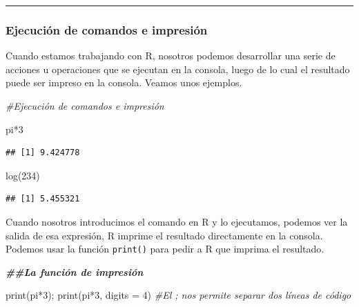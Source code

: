 \documentclass[
]{article}
\newenvironment{Shaded}{\begin{snugshade}}{\end{snugshade}}
\newcommand{\AttributeTok}[1]{\textcolor[rgb]{0.77,0.63,0.00}{#1}}
\newcommand{\CommentTok}[1]{\textcolor[rgb]{0.56,0.35,0.01}{\textit{#1}}}
\newcommand{\DecValTok}[1]{\textcolor[rgb]{0.00,0.00,0.81}{#1}}
\newcommand{\DocumentationTok}[1]{\textcolor[rgb]{0.56,0.35,0.01}{\textbf{\textit{#1}}}}
\newcommand{\FunctionTok}[1]{\textcolor[rgb]{0.00,0.00,0.00}{#1}}
\newcommand{\NormalTok}[1]{#1}
\newcommand{\SpecialCharTok}[1]{\textcolor[rgb]{0.00,0.00,0.00}{#1}}
\begin{document}
\begin{center}\rule{0.5\linewidth}{0.5pt}\end{center}

\hypertarget{ejecuciuxf3n-de-comandos-e-impresiuxf3n}{%
\subsubsection{Ejecución de comandos e
impresión}\label{ejecuciuxf3n-de-comandos-e-impresiuxf3n}}

Cuando estamos trabajando con R, nosotros podemos desarrollar una serie
de acciones u operaciones que se ejecutan en la consola, luego de lo
cual el resultado puede ser impreso en la consola. Veamos unos ejemplos.

\begin{Shaded}
\begin{Highlighting}[]
\CommentTok{\#Ejecución de comandos e impresión}

\NormalTok{pi}\SpecialCharTok{*}\DecValTok{3}
\end{Highlighting}
\end{Shaded}

\begin{verbatim}
## [1] 9.424778
\end{verbatim}

\begin{Shaded}
\begin{Highlighting}[]
\FunctionTok{log}\NormalTok{(}\DecValTok{234}\NormalTok{)}
\end{Highlighting}
\end{Shaded}

\begin{verbatim}
## [1] 5.455321
\end{verbatim}

Cuando nosotros introducimos el comando en R y lo ejecutamos, podemos
ver la salida de esa expresión, R imprime el resultado directamente en
la consola. Podemos usar la función \texttt{print()} para pedir a R que
imprima el resultado.

\begin{Shaded}
\begin{Highlighting}[]
\DocumentationTok{\#\#La función de impresión}

\FunctionTok{print}\NormalTok{(pi}\SpecialCharTok{*}\DecValTok{3}\NormalTok{); }\FunctionTok{print}\NormalTok{(pi}\SpecialCharTok{*}\DecValTok{3}\NormalTok{, }\AttributeTok{digits =} \DecValTok{4}\NormalTok{) }\CommentTok{\#El ; nos permite separar dos líneas de código}
\end{Highlighting}
\end{Shaded}
\end{document}
